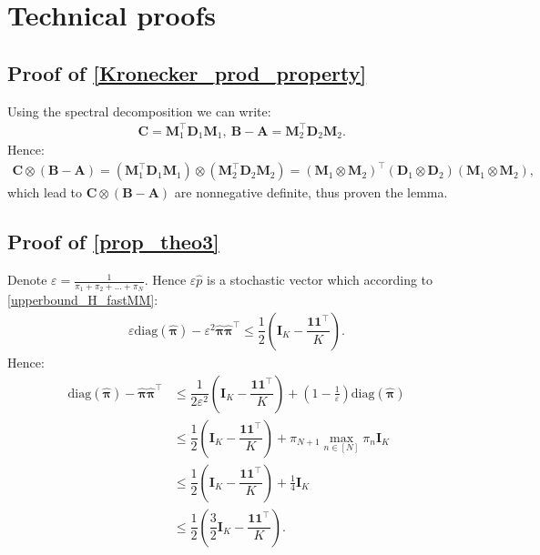 \documentclass{article}
\def\pib         {{\sbmm{\pi}}\XS}                 \def\Pib        {{\sbmm{\Pi}}\XS}
\def\XS{\xspace}
\def\sbmm#1{\ensuremath{\boldsymbol{#1}}}
\def\mA{{\bm{A}}}
\def\mB{{\bm{B}}}
\def\mC{{\bm{C}}}
\def\mD{{\bm{D}}}
\def\mI{{\bm{I}}}
\def\mM{{\bm{M}}}
\begin{document}
\section{Technical proofs}\label{sec_technical_proof}


\subsection{Proof of \texorpdfstring{\cref{Kronecker_prod_property}}{Lemma \ref*{Kronecker_prod_property}}}\label{lemma3_proof}

Using the spectral decomposition we can write:
    \begin{align*}
        &\mC=\mM_{1}^{\top}\mD_{1}\mM_{1},~
        \mB-\mA=\mM_{2}^{\top}\mD_{2}\mM_{2}.
    \end{align*}
    Hence:
    \begin{align*}
        \mC\otimes(\mB-\mA)=(\mM_{1}^{\top}\mD_{1}\mM_{1})\otimes(\mM_{2}^{\top}\mD_{2}\mM_{2})=(\mM_{1}\otimes \mM_{2})^{\top}(\mD_{1}\otimes \mD_{2})(\mM_{1}\otimes \mM_{2}),
    \end{align*}
    which lead to $\mC\otimes(\mB-\mA)$ are nonnegative definite, thus proven the lemma.
\subsection{Proof of \texorpdfstring{\cref{prop_theo3}}{Proposition \ref*{prop_theo3}}}\label{proof_prop_theo3}
Denote $\varepsilon=\frac{1}{\pi_1+\pi_2+\dots+\pi_N}$. Hence $\varepsilon\hat{p}$ is a stochastic vector which according to \cref{upperbound_H_fastMM}:
    \begin{align*}
        \varepsilon\text{diag}(\hat{\pib})-\varepsilon^{2}\hat{\pib}\hat{\pib}^{\top}\leq \dfrac{1}{2}\left(\mI_K-\dfrac{\bm{1}\bm{1}^{\top}}{K}\right).
    \end{align*}
Hence:
    \begin{align*}
        \text{diag}(\hat{\pib})-\hat{\pib}\hat{\pib}^{\top}&\leq \dfrac{1}{2\varepsilon^{2}}\left(\mI_K-\dfrac{\bm{1}\bm{1}^{\top}}{K}\right)+\left (1-\frac{1}{\varepsilon}\right)\text{diag}(\hat{\pib})\\
        &\leq\dfrac{1}{2}\left(\mI_K-\dfrac{\bm{1}\bm{1}^{\top}}{K}\right)+\pi_{N+1}\max_{n\in[N]}\pi_n \mI_K\\
        &\leq\dfrac{1}{2}\left(\mI_K-\dfrac{\bm{1}\bm{1}^{\top}}{K}\right)+\frac{1}{4}\mI_K\\
        &\leq\dfrac{1}{2}\left(\dfrac{3}{2}\mI_K-\dfrac{\bm{1}\bm{1}^{\top}}{K}\right).
    \end{align*}
    
\end{document}
